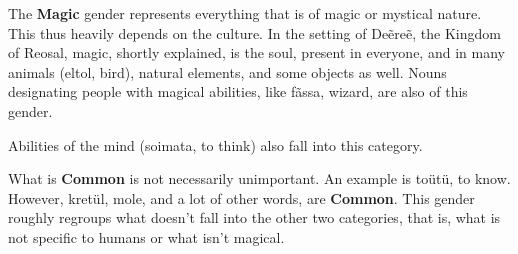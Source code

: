 The \textbf{Magic} gender represents everything that is of magic or mystical nature. This thus
heavily depends on the culture. In the setting of Deẽreẽ, the Kingdom of Reosal, magic, shortly
explained, is the soul, present in everyone, and in many animals (\gls{eltol}, bird),
natural elements, and some objects as well. Nouns designating people with magical abilities, like
\gls{fãssa}, wizard, are also of this gender.

Abilities of the mind (\gls{soimata}, to think) also fall into this
category.

What is \textbf{Common} is not necessarily unimportant. An example is 
\gls{toütü}, to know. However, \gls{kretül}, mole, and a lot of other words,
are \textbf{Common}. This gender roughly regroups what doesn’t fall into the other two categories,
that is, what is not specific to humans or what isn’t magical.

